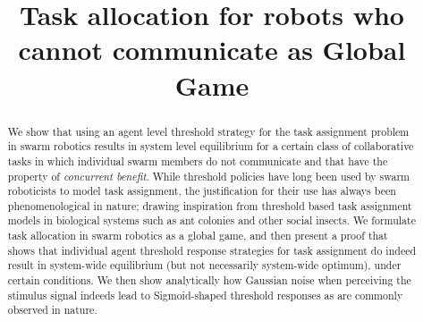 \documentclass[conference]{ieeeconf}
\begin{document}
\title{Task allocation for robots who cannot communicate as Global Game}

\author{
\and
{}
}

\maketitle

\begin{abstract}
We show that using an agent level threshold strategy for the task assignment problem in swarm robotics results in system level equilibrium for a certain class of collaborative tasks in which individual swarm members do not communicate and that have the property of \emph{concurrent benefit}. While threshold policies have long been used by swarm roboticists to model task assignment, the justification for their use has always been phenomenological in nature; drawing inspiration from threshold based task assignment models in biological systems such as ant colonies and other social insects. We formulate task allocation in swarm robotics as a global game, and then present a proof that shows that individual agent threshold response strategies for task assignment do indeed result in system-wide equilibrium (but not necessarily system-wide optimum), under certain conditions. We then show analytically how Gaussian noise when perceiving the stimulus signal indeeds lead to Sigmoid-shaped threshold responses as are commonly observed in nature. 
\end{abstract}

\IEEEpeerreviewmaketitle

\end{document}
